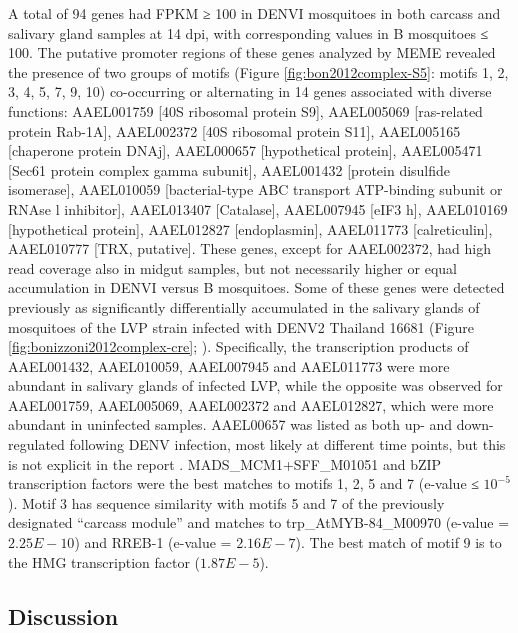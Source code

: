 

A total of 94 genes had FPKM ≥ 100 in \gls{DENVI} mosquitoes in both carcass and salivary gland samples at 14 \gls{dpi}, with corresponding values in B mosquitoes ≤ 100.
The putative promoter regions of these genes analyzed by MEME revealed the presence of two groups of motifs (Figure \ref{fig:bon2012complex-S5}: motifs 1, 2, 3, 4, 5, 7, 9, 10) co-occurring or alternating in 14 genes associated with diverse functions: AAEL001759 [40S ribosomal protein S9], AAEL005069 [ras-related protein Rab-1A], AAEL002372 [40S ribosomal protein S11], AAEL005165 [chaperone protein DNAj], AAEL000657 [hypothetical protein], AAEL005471 [Sec61 protein complex gamma subunit], AAEL001432 [protein disulfide isomerase], AAEL010059 [bacterial-type ABC transport ATP-binding subunit or RNAse l inhibitor], AAEL013407 [Catalase], AAEL007945 [eIF3 h], AAEL010169 [hypothetical protein], AAEL012827 [endoplasmin], AAEL011773 [calreticulin], AAEL010777 [TRX, putative].
These genes, except for AAEL002372, had high read coverage also in midgut samples, but not necessarily higher or equal accumulation in \gls{DENVI} versus B mosquitoes.
Some of these genes were detected previously as significantly differentially accumulated in the salivary glands of mosquitoes of the \gls{LVP} strain infected with \gls{DENV}2 Thailand 16681 (Figure \ref{fig:bonizzoni2012complex-cre}; \cite{Luplertlop2011}).
Specifically, the transcription products of AAEL001432, AAEL010059, AAEL007945 and AAEL011773 were more abundant in salivary glands of infected \gls{LVP}, while the opposite was observed for AAEL001759, AAEL005069, AAEL002372 and AAEL012827, which were more abundant in uninfected samples.
AAEL00657 was listed as both up- and down-regulated following \gls{DENV} infection, most likely at different time points, but this is not explicit in the report \cite{Luplertlop2011}.
MADS\_MCM1+SFF\_M01051 and bZIP transcription factors were the best matches to motifs 1, 2, 5 and 7 (e-value ≤ $10^{-5}$).
Motif 3 has sequence similarity with motifs 5 and 7 of the previously designated “carcass module” and matches to trp\_AtMYB-84\_M00970 (e-value = $2.25E-10$) and RREB-1 (e-value = $2.16E-7$).
The best match of motif 9 is to the HMG transcription factor ($1.87E-5$).


\subsection{Discussion}

